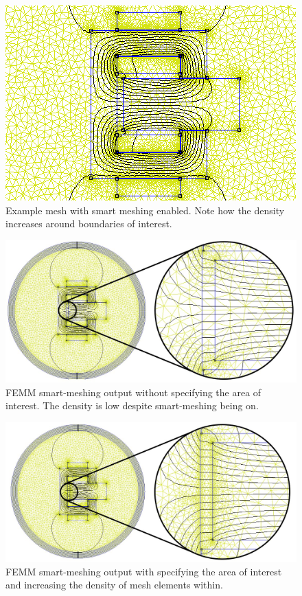 \documentclass[a4paper]{IEEEtran}
\begin{document}
    \begin{figure}[ht]
        \includegraphics[width = \linewidth]{Smartmesh-ON-NotDenseAirgap.png}
        \caption{Example mesh with smart meshing enabled. Note how the density increases around boundaries of interest.}
        \label{smartMesh} 
    \end{figure}

    \begin{figure}[ht]
        \includegraphics[width = \linewidth]{figurezoomnotdense.jpg}
        \caption{FEMM smart-meshing output without specifying the area of interest. The density is low despite smart-meshing being on.}
        \label{zoomNotDense} 
    \end{figure}

    \begin{figure}[ht]
        \includegraphics[width = \linewidth]{figurezoomdense.jpg}
        \caption{FEMM smart-meshing output with specifying the area of interest and increasing the density of mesh elements within.}
        \label{zoomDense} 
    \end{figure}
\end{document}
